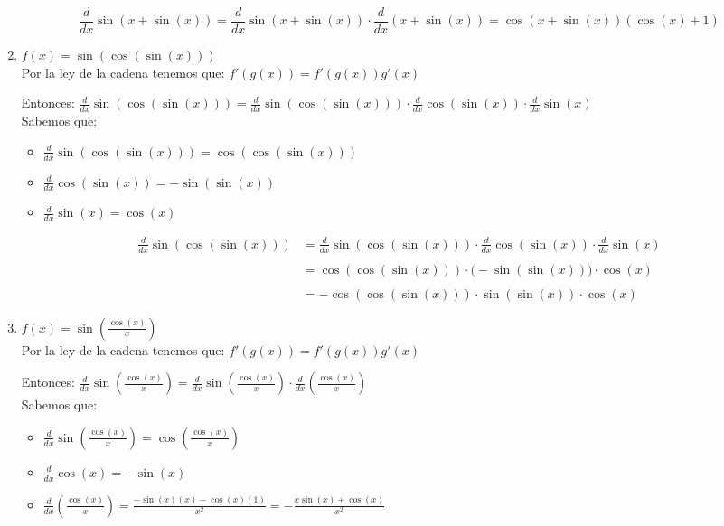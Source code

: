 \documentclass[12pt]{article}
\begin{document}
\begin{enumerate}[\hspace{9px} a)]
        \begin{equation*}
            \frac{d}{dx}\sin(x+\sin(x))=\frac{d}{dx}\sin(x+\sin(x))\cdot\frac{d}{dx}(x+\sin(x))=\cos(x+\sin(x))(\cos(x)+1)
        \end{equation*}
    \item \(f(x) = \sin(\cos(\sin(x)))\)\\

        Por la ley de la cadena tenemos que: \(f'(g(x))=f'(g(x))g'(x)\)\medskip

        Entonces: \quad \(\displaystyle\frac{d}{dx}\sin(\cos(\sin(x)))=\frac{d}{dx}\sin(\cos(\sin(x)))\cdot\frac{d}{dx}\cos(\sin(x))\cdot\frac{d}{dx}\sin(x)\)\\

        Sabemos que:
        \begin{itemize}
            \item \(\displaystyle\frac{d}{dx}\sin(\cos(\sin(x)))=\cos(\cos(\sin(x)))\)
            \item \(\displaystyle\frac{d}{dx}\cos(\sin(x))=-\sin(\sin(x))\)
            \item \(\displaystyle\frac{d}{dx}\sin(x)=\cos(x)\)
        \end{itemize}

        \begin{align*}
            \displaystyle\frac{d}{dx}\sin(\cos(\sin(x)))&=\frac{d}{dx}\sin(\cos(\sin(x)))\cdot\frac{d}{dx}\cos(\sin(x))\cdot\frac{d}{dx}\sin(x)\\ \\
            &=\cos(\cos(\sin(x)))\cdot\big(-\sin(\sin(x))\big)\cdot\cos(x)\\ \\
            &=-\cos(\cos(\sin(x)))\cdot\sin(\sin(x))\cdot\cos(x)
        \end{align*}
    \item \(f(x) = \sin\left(\displaystyle\frac{\cos(x)}{x}\right)\)\\

        Por la ley de la cadena tenemos que: \(f'(g(x))=f'(g(x))g'(x)\)\medskip

        Entonces: \quad \(\displaystyle\frac{d}{dx}\sin\left(\frac{\cos(x)}{x}\right)=\displaystyle\frac{d}{dx}\sin\left(\frac{\cos(x)}{x}\right)\cdot\frac{d}{dx}\left(\frac{\cos(x)}{x}\right)\)\\

        Sabemos que:
        \begin{itemize}
            \item \(\displaystyle\frac{d}{dx}\sin\left(\frac{\cos(x)}{x}\right)=\cos\left(\frac{\cos(x)}{x}\right)\)
            \item \(\displaystyle\frac{d}{dx}\cos(x)=-\sin(x)\)
            \item \(\displaystyle\frac{d}{dx}\left(\frac{\cos(x)}{x}\right)=\frac{-\sin(x)(x)-\cos(x)(1)}{x^2}=-\frac{x\sin(x)+\cos(x)}{x^2}\)
        \end{itemize}


\end{enumerate}
\end{document}
